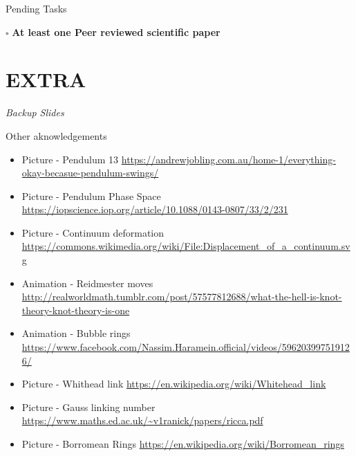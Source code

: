 \documentclass[handout,10pt]{beamer}
\begin{document}
\begin{frame}{Pending Tasks}
	\begin{alertblock}{$\square$ \textbf{At least one Peer reviewed scientific paper}}
		\nocite{Miti2018,Miti2019}
		
		
	\end{alertblock}

\end{frame}


  
\appendix
\section{EXTRA}
\begin{frame}
	\begin{center}
	\Huge\emph{Backup Slides}
	\end{center}
\end{frame}
\addtocounter{framenumber}{-1}



\begin{frame}[t]{Other aknowledgements}
	\begin{itemize}
		\item Picture - Pendulum 13
			\url{https://andrewjobling.com.au/home-1/everything-okay-becasue-pendulum-swings/}
		\item Picture - Pendulum Phase Space
			\url{https://iopscience.iop.org/article/10.1088/0143-0807/33/2/231}
				\item Picture - Continuum deformation
			\url{https://commons.wikimedia.org/wiki/File:Displacement_of_a_continuum.svg}
		\item Animation - Reidmester moves
			\url{http://realworldmath.tumblr.com/post/57577812688/what-the-hell-is-knot-theory-knot-theory-is-one}
		\item Animation - Bubble rings
			\url{https://www.facebook.com/Nassim.Haramein.official/videos/596203997519126/}
		\item Picture - Whithead link 
			\url{https://en.wikipedia.org/wiki/Whitehead_link}
		\item Picture - Gauss linking number 
			\url{https://www.maths.ed.ac.uk/~v1ranick/papers/ricca.pdf}
		\item Picture - Borromean Rings
			\url{https://en.wikipedia.org/wiki/Borromean_rings}	
	\end{itemize}
\end{frame}


\end{document}

